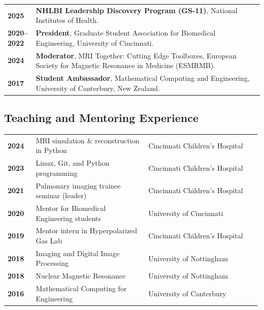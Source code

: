 \documentclass[11pt,]{scrartcl}
\begin{document}
\begin{table}[h!]
{\def\arraystretch{1.4}\tabcolsep=0pt
\begin{tabular}{p{0.11\linewidth}p{0.89\linewidth}}

\textbf{2025} & \textbf{NHLBI Leadership Discovery Program (GS-11)}, National Institutes of Health. \\[0.1cm]

\textbf{2020--2022} & \textbf{President}, Graduate Student Association for Biomedical Engineering, University of Cincinnati. \\[0.1cm]

\textbf{2024} & \textbf{Moderator}, MRI Together: Cutting Edge Toolboxes, European Society for Magnetic Resonance in Medicine (ESMRMB). \\[0.1cm]

\textbf{2017} & \textbf{Student Ambassador}, Mathematical Computing and Engineering, University of Canterbury, New Zealand. \\

\end{tabular}%
}
\end{table}

\subsection{Teaching and Mentoring Experience}

\begin{table}[h!]
{\def\arraystretch{1.4}\tabcolsep=0pt
\begin{tabular}{p{0.11\linewidth}p{0.44\linewidth}p{0.44\linewidth}}

\textbf{2024} & MRI simulation \& reconstruction in Python & Cincinnati Children's Hospital \\

\textbf{2023} & Linux, Git, and Python programming & Cincinnati Children's Hospital \\

\textbf{2021} & Pulmonary imaging trainee seminar (leader) & Cincinnati Children's Hospital\\

\textbf{2020} & Mentor for Biomedical Engineering students & University of Cincinnati\\

\textbf{2019} & Mentor intern in Hyperpolarized Gas Lab & Cincinnati Children's Hospital\\
  
\textbf{2018} & Imaging and Digital Image Processing & University of Nottingham \\
  
\textbf{2018} & Nuclear Magnetic Resonance & University of Nottingham \\

\textbf{2016} & Mathematical Computing for Engineering & University of Canterbury \\
  
\end{tabular}%
}
\end{table}
\end{document}
